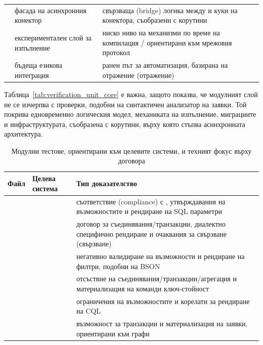 \begin{table}[H]
\begin{tabularx}{\textwidth}{L{3.2cm}L{3.8cm}Y}
 & фасада на асинхронния конектор & свързваща (bridge) логика между  и куки на конектора, съобразени с корутини \\
 & експериментален слой за изпълнение & ниско ниво на механизми по време на компилация / ориентирани към мрежовия протокол \\
 & бъдеща езикова интеграция & ранен път за автоматизация, базирана на отражение (отражение) \\
\bottomrule
\end{tabularx}
\end{table}

Таблица~\ref{tab:verification_unit_core} е важна, защото показва, че модулният слой не се изчерпва с проверки, подобни на синтактичен анализатор на заявки. Той покрива едновременно логическия модел, механиката на изпълнение, миграциите и инфраструктурата, съобразена с корутини, върху която стъпва асинхронната архитектура.

\begin{table}[H]
\centering
\small
\caption{Модулни тестове, ориентирани към целевите системи, и техният фокус върху договора}
\label{tab:verification_unit_connectors}
\begin{tabularx}{\textwidth}{L{3.4cm}L{3.1cm}Z}
\toprule
\textbf{Файл} & \textbf{Целева система} & \textbf{Тип доказателство} \\
\midrule
{} &  & съответствие (compliance) с , утвърждавания на възможностите и рендиране на SQL параметри \\
 &  & договор за съединявания/транзакции, диалектно специфично рендиране и очаквания за свързване (свързване) \\
 &  & негативно валидиране на възможности и рендиране на филтри, подобни на BSON \\
 &  & отсъствие на съединявания/транзакции/агрегация и материализация на команди ключ-стойност \\
 &  & ограничения на възможностите и корелати за рендиране на CQL \\
 &  & възможност за транзакции и материализация на заявки, ориентирани към графи \\
\bottomrule
\end{tabularx}
\end{table}

